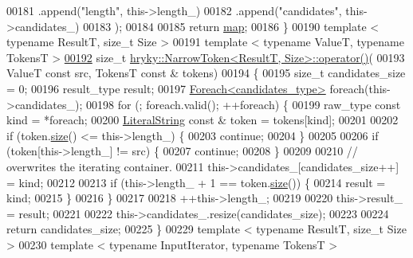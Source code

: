 \begin{DoxyCode}
00181      .append(\textcolor{stringliteral}{"length"}, this->length\_)
00182      .append(\textcolor{stringliteral}{"candidates"}, this->candidates\_)
00183      );
00184     
00185     \textcolor{keywordflow}{return} \hyperlink{namespacehryky_1_1reduction_ac5eae270cf8047b294dc4ff3e5e11a79}{map};
00186 \}
00190 \textcolor{keyword}{template} < \textcolor{keyword}{typename} ResultT, \textcolor{keywordtype}{size\_t} Size >
00191 \textcolor{keyword}{template} < \textcolor{keyword}{typename} ValueT, \textcolor{keyword}{typename} TokensT >
\hypertarget{narrow__token_8h_source_l00192}{}\hyperlink{classhryky_1_1_narrow_token_ada653c645c09f84ab73cec2ebcbc5a4c}{00192} \textcolor{keywordtype}{size\_t} \hyperlink{classhryky_1_1_narrow_token}{hryky::NarrowToken<ResultT, Size>::operator()}(
00193     ValueT \textcolor{keyword}{const} src, TokensT \textcolor{keyword}{const} & tokens)
00194 \{
00195     \textcolor{keywordtype}{size\_t} candidates\_size = 0;
00196     result\_type result;
00197     \hyperlink{classhryky_1_1_foreach}{Foreach<candidates_type>} \textcolor{keywordflow}{foreach}(this->candidates\_);
00198     \textcolor{keywordflow}{for} (; \textcolor{keywordflow}{foreach}.valid(); ++\textcolor{keywordflow}{foreach}) \{
00199         raw\_type \textcolor{keyword}{const} kind = *\textcolor{keywordflow}{foreach};
00200         \hyperlink{classhryky_1_1_literal_string}{LiteralString} \textcolor{keyword}{const} & token = tokens[kind];
00201         
00202         \textcolor{keywordflow}{if} (token.\hyperlink{classhryky_1_1_literal_string_af2221b58fef20ed4d474891681995c97}{size}() <= this->length\_) \{
00203             \textcolor{keywordflow}{continue};
00204         \}
00205 
00206         \textcolor{keywordflow}{if} (token[this->length\_] != src) \{
00207             \textcolor{keywordflow}{continue};
00208         \}
00209 
00210         \textcolor{comment}{// overwrites the iterating container.}
00211         this->candidates\_[candidates\_size++] = kind;
00212 
00213         \textcolor{keywordflow}{if} (this->length\_ + 1 == token.\hyperlink{classhryky_1_1_literal_string_af2221b58fef20ed4d474891681995c97}{size}()) \{
00214             result = kind;
00215         \}
00216     \}
00217 
00218     ++this->length\_;
00219 
00220     this->result\_ = result;
00221 
00222     this->candidates\_.resize(candidates\_size);
00223     
00224     \textcolor{keywordflow}{return} candidates\_size;
00225 \}
00229 \textcolor{keyword}{template} < \textcolor{keyword}{typename} ResultT, \textcolor{keywordtype}{size\_t} Size >
00230 \textcolor{keyword}{template} < \textcolor{keyword}{typename} InputIterator, \textcolor{keyword}{typename} TokensT >

\end{DoxyCode}
